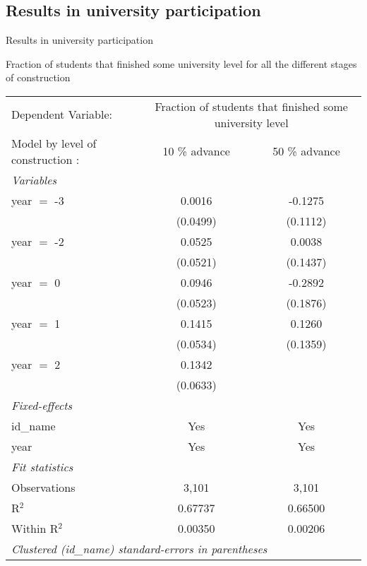 \documentclass[9pt]{beamer}
\begin{document}

\subsection{Results in university participation}
\begin{frame}{Results in university participation}
     
 \begin{center} \label{tab:B.4} 
 
Fraction of students that finished some university level for all the different stages of construction

 \tiny
     \begin{tabular}{lcc}
   \tabularnewline \midrule \midrule
   Dependent Variable: & \multicolumn{2}{c}{Fraction of students that finished some university level}\\
    Model by level of construction   :       & 10 \% advance          & 50 \% advance \\  
   \midrule
   \emph{Variables}\\
   year $=$ -3  & 0.0016         & -0.1275\\   
                & (0.0499)       & (0.1112)\\   
   year $=$ -2  & 0.0525         & 0.0038\\   
                & (0.0521)       & (0.1437)\\   
   year $=$ 0   & 0.0946   & -0.2892\\   
                & (0.0523)       & (0.1876)\\   
   year $=$ 1   & 0.1415 & 0.1260\\   
                & (0.0534)       & (0.1359)\\   
   year $=$ 2   & 0.1342  &   \\   
                & (0.0633)       &   \\   
   \midrule
   \emph{Fixed-effects}\\
   id\_name     & Yes            & Yes\\  
   year         & Yes            & Yes\\  
   \midrule
   \emph{Fit statistics}\\
   Observations & 3,101          & 3,101\\  
   R$^2$        & 0.67737        & 0.66500\\  
   Within R$^2$ & 0.00350        & 0.00206\\  
   \midrule \midrule
   \multicolumn{3}{l}{\emph{Clustered (id\_name) standard-errors in parentheses}}\\
   \midrule
\end{tabular}
 \end{center}
 
\end{frame}
\end{document}
